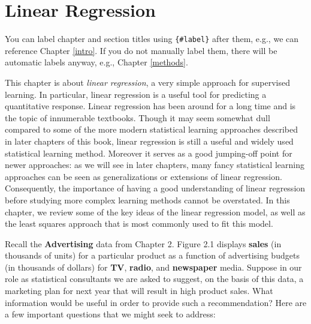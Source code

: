 \documentclass[
]{book}
\begin{document}
\hypertarget{linreg}{%
\chapter{Linear Regression}\label{linreg}}

You can label chapter and section titles using \texttt{\{\#label\}} after them, e.g., we can reference Chapter \ref{intro}. If you do not manually label them, there will be automatic labels anyway, e.g., Chapter \ref{methods}.

This chapter is about \emph{linear regression}, a very simple approach for supervised learning.
In particular, linear regression is a useful tool for predicting a quantitative response.
Linear regression has been around for a long time and is the topic of innumerable textbooks.
Though it may seem somewhat dull compared to some of the more modern statistical learning approaches described in later chapters of this book, linear regression is still a useful and widely used statistical learning method.
Moreover it serves as a good jumping-off point for newer approaches: as we will see in later chapters, many fancy statistical learning approaches can be seen as generalizations or extensions of linear regression.
Consequently, the importance of having a good understanding of linear regression before studying more complex learning methods cannot be overstated.
In this chapter, we review some of the key ideas of the linear regression model, as well as the least squares approach that is most commonly used to fit this model.

Recall the \textbf{Advertising} data from Chapter 2.
Figure 2.1 displays \textbf{sales} (in thousands of units) for a particular product as a function of advertising budgets (in thousands of dollars) for \textbf{TV}, \textbf{radio}, and \textbf{newspaper} media.
Suppose in our role as statistical consultants we are asked to suggest, on the basis of this data, a marketing plan for next year that will result in high product sales.
What information would be useful in order to provide such a recommendation?
Here are a few important questions that we might seek to address:
\end{document}
